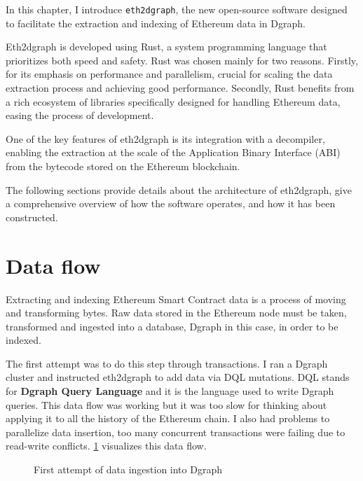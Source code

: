 \label{chapter-4}

\noindent In this chapter, I introduce {\tt eth2dgraph}, the new open-source software designed to facilitate the extraction and indexing of Ethereum data in Dgraph.

Eth2dgraph is developed using Rust, a system programming language that prioritizes both speed and safety. Rust was chosen mainly for two reasons. Firstly, for its emphasis on performance and parallelism, crucial for scaling the data extraction process and achieving good performance. Secondly, Rust benefits from a rich ecosystem of libraries specifically designed for handling Ethereum data, easing the process of development.

One of the key features of eth2dgraph is its integration with a decompiler, enabling the extraction at the scale of the Application Binary Interface (ABI) from the bytecode stored on the Ethereum blockchain. 

The following sections provide details about the architecture of eth2dgraph, give a comprehensive overview of how the software operates, and how it has been constructed.

\section{Data flow}

Extracting and indexing Ethereum Smart Contract data is a process of moving and transforming bytes. Raw data stored in the Ethereum node must be taken, transformed and ingested into a database, Dgraph in this case, in order to be indexed. 

The first attempt was to do this step through transactions. I ran a Dgraph cluster and instructed eth2dgraph to add data via DQL mutations. DQL stands for \textbf{Dgraph Query Language} and it is the language used to write Dgraph queries. This data flow was working but it was too slow for thinking about applying it to all the history of the Ethereum chain. I also had problems to parallelize data insertion, too many concurrent transactions were failing due to read-write conflicts. \cref{fig:data-flow-1} visualizes this data flow.

\begin{figure}[H]
\centering
{}
\caption[First attempt of data ingestion into Dgraph]{First attempt of data ingestion into Dgraph}
\label{fig:data-flow-1}
\end{figure}


